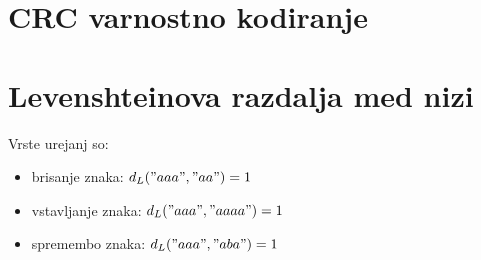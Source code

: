 \documentclass[10pt,a4paper,oneside]{book}
\newenvironment{items}{
\begin{itemize}
  \setlength{\itemsep}{1pt}
  \setlength{\parskip}{0pt}
  \setlength{\parsep}{0pt}
}{\end{itemize}}
\begin{document}

\section{CRC varnostno kodiranje}

\section{Levenshteinova razdalja med nizi}

Vrste urejanj so:
\begin{items}
\item brisanje znaka: $d_L("aaa", "aa") = 1$
\item vstavljanje znaka: $d_L("aaa", "aaaa") = 1$
\item spremembo znaka: $d_L("aaa", "aba") = 1$
\end{items}

\end{document}
